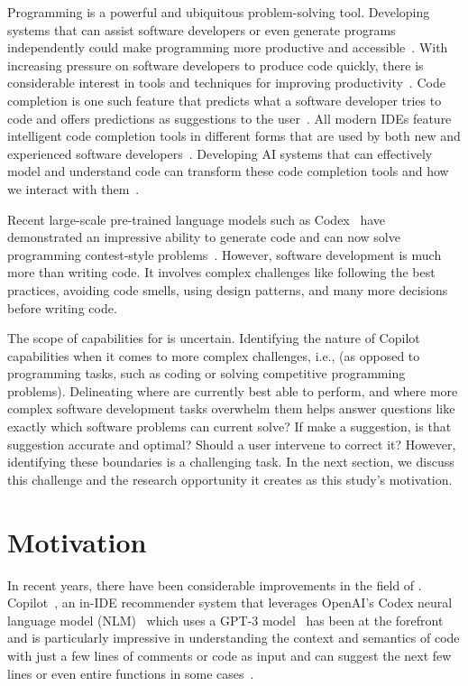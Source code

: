 \label{chapter:introduction}
Programming is a powerful and ubiquitous problem-solving tool. Developing systems that can assist software developers or even generate programs independently could make programming more productive and accessible~\cite{peggyprod}.
With increasing pressure on software developers to produce code quickly, there is considerable interest in tools and techniques for improving productivity~\cite{productivity}.
Code completion is one such feature that predicts what a software developer tries to code and offers predictions as suggestions to the user~\cite{cct}. All modern IDEs feature intelligent code completion tools in different forms that are used by both new and experienced software developers~\cite{cct_usage}. Developing AI systems that can effectively model and understand code can transform these code completion tools and how we interact with them~\cite{cct_usage}.

Recent large-scale pre-trained language models such as Codex~\cite{copilot} have demonstrated an impressive ability to generate code and can now solve programming contest-style problems~\cite{empirical_eval}. 
However, software development is much more than writing code. It involves complex challenges like following the best practices, avoiding code smells, using design patterns, and many more decisions before writing code.

The scope of capabilities for \cct{} is uncertain. Identifying the nature of Copilot capabilities when it comes to more complex challenges, i.e., \AISE{} (as opposed to programming tasks, such as coding or solving competitive programming problems). Delineating where \cct{} are currently best able to perform, and where more complex software development tasks overwhelm them helps answer questions like exactly which software problems can current \cct{} solve? 
If \cct{} make a suggestion, is that suggestion accurate and optimal? Should a user intervene to correct it? However, identifying these boundaries is a challenging task. In the next section, we discuss this challenge and the research opportunity it creates as this study's motivation.

\section{Motivation}
In recent years, there have been considerable improvements in the field of \cct{}. 
Copilot~\cite{Copilot-web}, an in-IDE recommender system that leverages OpenAI's Codex neural language model (NLM)~\cite{copilot} which uses a GPT-3 model~\cite{Gpt3} has been at the forefront and is particularly impressive in understanding the context and semantics of code with just a few lines of comments or code as input and can suggest the next few lines or even entire functions in some cases~\cite{copilot}.

